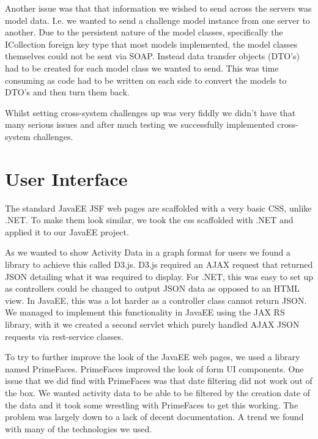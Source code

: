 Another issue was that that information we wished to send across the servers was model data. I.e. we wanted to send a challenge model instance from one server to another. Due to the persistent nature of the model classes, specifically the ICollection foreign key type that most models implemented, the model classes themselves could not be sent via SOAP. Instead data transfer objects (DTO’s) had to be created for each model class we wanted to send. This was time consuming as code had to be written on each side to convert the models to DTO’s and then turn them back. \par
Whilst setting cross-system challenges up was very fiddly we didn’t have that many serious issues and after much testing we successfully implemented cross-system challenges.
\section{User Interface}
The standard JavaEE JSF web pages are scaffolded with a very basic CSS, unlike .NET. To make them look similar, we took the css scaffolded with .NET and applied it to our JavaEE project. \par
As we wanted to show Activity Data in a graph format for users we found a library to achieve this called D3.js\cite{D3.js}. D3.js required an AJAX request that returned JSON detailing what it was required to display. For .NET, this was easy to set up as controllers could be changed to output JSON data as opposed to an HTML view. In JavaEE, this was a lot harder as a controller class cannot return JSON. We managed to implement this functionality in JavaEE using the JAX RS\cite{JAXRS} library, with it we created a second servlet which purely handled AJAX JSON requests via rest-service classes. \par
To try to further improve the look of the JavaEE web pages, we used a library named PrimeFaces. PrimeFaces improved the look of form UI components. One issue that we did find with PrimeFaces was that date filtering did not work out of the box. We wanted activity data to be able to be filtered by the creation date of the data and it took some wrestling with PrimeFaces to get this working. The problem was largely down to a lack of decent documentation. A trend we found with many of the technologies we used.
